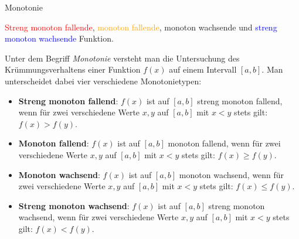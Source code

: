 \begin{bla}{Monotonie}
  \begin{marginfigure}
    \caption{\textcolor{red}{Streng monoton fallende}, \textcolor{orange}{monoton fallende}, \textcolor{black!60!green}{monoton wachsende} und \textcolor{blue}{streng monoton wachsende} Funktion.}
  \end{marginfigure}
  Unter dem Begriff \emph{Monotonie} versteht man die Untersuchung des Krümmungsverhaltens einer Funktion $f(x)$ auf einem Intervall $[a,b]$. Man unterscheidet dabei vier verschiedene Monotonietypen:
  \begin{itemize}
    \item \textbf{Streng monoton fallend}: $f(x)$ ist auf $[a,b]$ streng monoton fallend, wenn für zwei verschiedene Werte $x,y$ auf $[a,b]$ mit $x<y$ stets gilt: $f(x)>f(y)$.
    \item \textbf{Monoton fallend}: $f(x)$ ist auf $[a,b]$ monoton fallend, wenn für zwei verschiedene Werte $x,y$ auf $[a,b]$ mit $x<y$ stets gilt: $f(x)\geq f(y)$.
    \item \textbf{Monoton wachsend}: $f(x)$ ist auf $[a,b]$ monoton wachsend, wenn für zwei verschiedene Werte $x,y$ auf $[a,b]$ mit $x<y$ stets gilt: $f(x)\leq f(y)$.
    \item \textbf{Streng monoton wachsend}: $f(x)$ ist auf $[a,b]$ streng monoton wachsend, wenn für zwei verschiedene Werte $x,y$ auf $[a,b]$ mit $x<y$ stets gilt: $f(x)<f(y)$.
  \end{itemize}
\end{bla}

